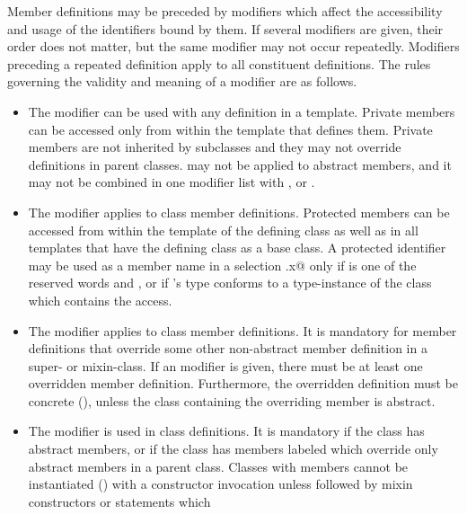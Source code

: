 \documentclass[11pt]{report}
\newcommand{\ifqualified}[1]{}
\begin{document}
Member definitions may be preceded by modifiers which affect the
\ifqualified{qualified names, }accessibility and usage of the
identifiers bound by them.  If several modifiers are given, their
order does not matter, but the same modifier may not occur repeatedly.
Modifiers preceding a repeated definition apply to all constituent
definitions.  The rules governing the validity and meaning of a
modifier are as follows.
\begin{itemize}
\item
The \verb@private@ modifier can be used with any definition in a
template. Private members can be accessed only from within the template
that defines them.  
Private members are not inherited by subclasses and they
may not override definitions in parent classes.
\verb@private@ may not be applied to abstract members, and it
may not be combined in one modifier list with
\verb@protected@, \verb@final@ or \verb@override@.
\item
The \verb@protected@ modifier applies to class member definitions.
Protected members can be accessed from within the template of the defining
class as well as in all templates that have the defining class as a base class.
A protected identifier \verb@x@ may be used as
a member name in a selection \verb@r.x@ only if \verb@r@ is one of the reserved
words \verb@this@ and
\verb@super@, or if \verb@r@'s type conforms to a type-instance of the class
which contains the access.
\item
The \verb@override@ modifier applies to class member definitions.  It
is mandatory for member definitions that override some other
non-abstract member definition in a super- or mixin-class. If an
\verb@override@ modifier is given, there must be at least one
overridden member definition.  Furthermore, the overridden definition
must be concrete (), unless the class containing the
overriding member is abstract.
\item
The \verb@abstract@ modifier is used in class definitions. It is
mandatory if the class has abstract members, or if the class has
members labeled \verb@override@ which override only abstract members
in a parent class.  Classes with \verb@abstract@ members
cannot be instantiated () with a constructor
invocation unless followed by mixin constructors or statements which

\end{itemize}
\end{document}
